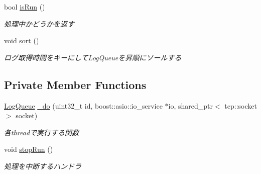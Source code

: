 \begin{DoxyCompactItemize}
\mbox{\label{class_session_a433cadcd740535d8b8bf58e27dbfe48c}} 
bool \mbox{\hyperlink{class_session_a433cadcd740535d8b8bf58e27dbfe48c}{is\+Run}} ()
\begin{DoxyCompactList}\small\item\em 処理中かどうかを返す \end{DoxyCompactList}\item 
\mbox{\label{class_session_a2cd066dba731c145e3d553ae558b4273}} 
void \mbox{\hyperlink{class_session_a2cd066dba731c145e3d553ae558b4273}{sort}} ()
\begin{DoxyCompactList}\small\item\em ログ取得時間をキーにして\+Log\+Queueを昇順にソールする \end{DoxyCompactList}\end{DoxyCompactItemize}
\subsection*{Private Member Functions}
\begin{DoxyCompactItemize}
\item 
\mbox{\hyperlink{class_log_queue}{Log\+Queue}} \mbox{\hyperlink{class_session_a1723417ecebdb373c736aedff685d401}{\+\_\+do}} (uint32\+\_\+t id, boost\+::asio\+::io\+\_\+service $\ast$io, shared\+\_\+ptr$<$ tcp\+::socket $>$ socket)
\begin{DoxyCompactList}\small\item\em 各threadで実行する関数 \end{DoxyCompactList}\item 
\mbox{\label{class_session_a675d980ab2d2127cd33e49d5590771f0}} 
void \mbox{\hyperlink{class_session_a675d980ab2d2127cd33e49d5590771f0}{stop\+Run}} ()
\begin{DoxyCompactList}\small\item\em 処理を中断するハンドラ \end{DoxyCompactList}\end{DoxyCompactItemize}
